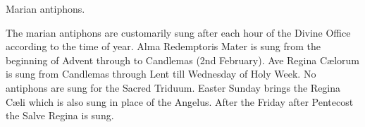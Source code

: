 \beginhymn Marian antiphons.

The marian antiphons are customarily sung after each hour of the Divine Office
according to the time of year.
Alma Redemptoris Mater is sung from the beginning of Advent through
to Candlemas (2nd February).  Ave Regina C\ae lorum is sung from
Candlemas through Lent till Wednesday of Holy Week.
No antiphons are sung for the Sacred Triduum.  Easter Sunday brings the
Regina C\ae li which is also sung in place of the Angelus.
After the Friday after Pentecost the Salve Regina is sung.

\bigskip




\paginaproxima



\bigskip




\bigskip

\bigskip

\paginaproxima





